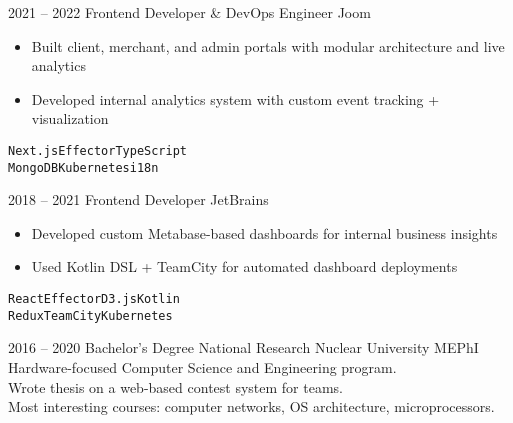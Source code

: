 \documentclass[2pt]{template}
\begin{document}
\begin{entrylist}
    \entry
    {2021 -- 2022}
    {Frontend Developer \& DevOps Engineer}
    {Joom}
    {
        \begin{itemize}[noitemsep,topsep=5pt,leftmargin=8pt]
            \item Built client, merchant, and admin portals with modular architecture and live analytics
            \item Developed internal analytics system with custom event tracking + visualization
        \end{itemize}
        \texttt{Next.js}\slashsep\texttt{Effector}\slashsep\texttt{TypeScript}\\
        {\color{gray}\texttt{MongoDB}\slashsep\texttt{Kubernetes}\slashsep\texttt{i18n}}}

    \entry
    {2018 -- 2021}
    {Frontend Developer}
    {JetBrains}
    {
        \begin{itemize}[noitemsep,topsep=5pt,leftmargin=8pt]
            \item Developed custom Metabase-based dashboards for internal business insights
            \item Used Kotlin DSL + TeamCity for automated dashboard deployments
        \end{itemize}
        \texttt{React}\slashsep\texttt{Effector}\slashsep\texttt{D3.js}\slashsep\texttt{Kotlin}\\
        {\color{gray}\texttt{Redux}\slashsep\texttt{TeamCity}\slashsep\texttt{Kubernetes}}}

\end{entrylist}



\begin{entrylist}
	\entry
	{2016 -- 2020}
	{Bachelor's Degree}
	{National Research Nuclear University MEPhI}
	{Hardware-focused Computer Science and Engineering program.\\
	Wrote thesis on a web-based contest system for teams.\\
	Most interesting courses: computer networks, OS architecture, microprocessors.}
\end{entrylist}
\end{document}
